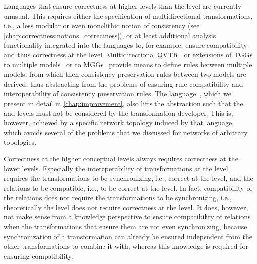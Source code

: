 Languages that ensure correctness at higher levels than the \leveltransformation level are currently unusual.
This requires either the specification of multidirectional transformations, i.e., a less modular or even monolithic notion of consistency (see \autoref{chap:correctness:notions_correctness}), or at least additional analysis functionality integrated into the languages to, for example, ensure compatibility and thus correctness at the \levelnetworkrule level.
Multidirectional \gls{QVTR}~\cite{macedo2014FrameworkMultiDirectional-BX} or extensions of \glspl{TGG} to multiple models~\cite{trollmann2015TransformationTGGtoMultiModel-ICMT,trollmann2016SynchronizationTGGtoMultiModel-ICMT} or to \glspl{MGG}~\cite{konigs2006MGGs-sosym} provide means to define rules between multiple models, from which then consistency preservation rules between two models are derived, thus abstracting from the problems of ensuring rule compatibility and interoperability of consistency  preservation rules.
The \commonalities language~, which we present in detail in \autoref{chap:improvement}, also lifts the abstraction such that the \levelnetworkrelation and \levelnetworkrule levels must not be considered by the transformation developer.
This is, however, achieved by a specific network topology induced by that language, which avoids several of the problems that we discussed for networks of arbitrary topologies.

Correctness at the higher conceptual levels always requires correctness at the lower levels.
Especially the interoperability of transformations at the \levelnetworkrule level requires the transformations to be synchronizing, i.e., correct at the \leveltransformation level, and the relations to be compatible, i.e., to be correct at the \levelnetworkrelation level.
In fact, compatibility of the relations does not require the transformations to be synchronizing, i.e., theoretically the \levelnetworkrelation level does not require correctness at the \leveltransformation level.
It does, however, not make sense from a knowledge perspective to ensure compatibility of relations when the transformations that ensure them are not even synchronizing, because synchronization of a transformation can already be ensured independent from the other transformations to combine it with, whereas this knowledge is required for ensuring compatibility.

